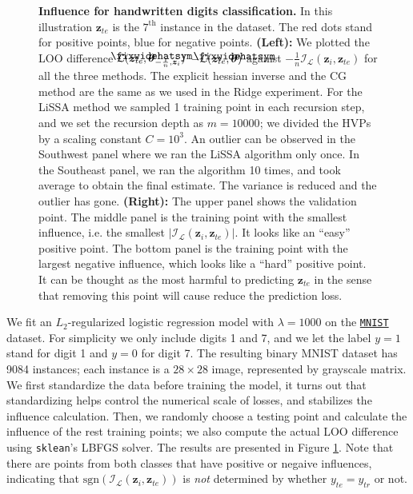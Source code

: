 \documentclass{article}
\newcommand\lowerwidehatsym{%
  \text{\smash{\raisebox{-1.3ex}{%
    $\fixwidehatsym$}}}}
\newcommand\fixwidehat[1]{%
  \mathchoice
    {\accentset{\displaystyle\lowerwidehatsym}{#1}}
    {\accentset{\textstyle\lowerwidehatsym}{#1}}
    {\accentset{\scriptstyle\lowerwidehatsym}{#1}}
    {\accentset{\scriptscriptstyle\lowerwidehatsym}{#1}}
}
\begin{document}
\begin{figure}[ht]
\begin{center}
\vskip -0.1in
\caption{\textbf{Influence for handwritten digits classification.} In this illustration $\bm{z}_{te}$ is the $7^{\text{th}}$ instance in the dataset. The red dots stand for positive points, blue for negative points. \textbf{(Left):} We plotted the LOO difference $\mathcal{L}(\bm{z}_{te}, \fixwidehat{\bm{\theta}}_{-\frac{1}{n},\bm{z}_i})$ $- \mathcal{L}(\bm{z}_{te}, \fixwidehat{\bm{\theta}})$ against $-\frac{1}{n}\mathcal{I}_{\mathcal{L}}(\bm{z}_{i}, \bm{z}_{te})$ for all the three methods. The explicit hessian inverse and the CG method are the same as we used in the Ridge experiment. For the LiSSA method we sampled 1 training point in each recursion step, and we set the recursion depth as $m=10000$; we divided the HVPs by a scaling constant $C=10^3$. An outlier can be observed in the Southwest panel where we ran the LiSSA algorithm only once. In the Southeast panel, we ran the algorithm 10 times, and took average to obtain the final estimate. The variance is reduced and the outlier has gone. \textbf{(Right):} The upper panel shows the validation point. The middle panel is the training point with the smallest influence, i.e. the smallest $| \mathcal{I}_{\mathcal{L}}(\bm{z}_{i}, \bm{z}_{te}) |$. It looks like an ``easy'' positive point. The bottom panel is the training point with the largest negative influence, which looks like a ``hard'' positive point. It can be thought as the most harmful to predicting $\bm{z}_{te}$ in the sense that removing this point will cause reduce the prediction loss.} 
\label{logit_examples}
\end{center}
\vskip -0.25in
\end{figure} 

We fit an $L_2$-regularized logistic regression model with $\lambda = 1000$ on the \href{http://yann.lecun.com/exdb/mnist/}{\texttt{MNIST}} dataset. For simplicity we only include digits 1 and 7, and we let the label $y=1$ stand for digit 1 and $y=0$ for digit 7. The resulting binary MNIST dataset has 9084 instances; each instance is a $28\times 28$ image, represented by grayscale matrix. We first standardize the data before training the model, it turns out that standardizing helps control the numerical scale of losses, and stabilizes the influence calculation. Then, we randomly choose a testing point and calculate the influence of the rest training points; we also compute the actual LOO difference using \texttt{sklean}'s LBFGS solver. The results are presented in Figure \ref{logit_examples}. Note that there are points from both classes that have positive or negaive influences, indicating that $\text{sgn}(\mathcal{I}_{\mathcal{L}}(\bm{z}_{i}, \bm{z}_{te}))$ is \emph{not} determined by whether $y_{te}=y_{tr}$ or not.
\end{document}
